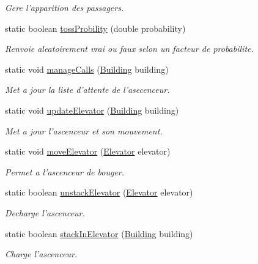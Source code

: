 \begin{DoxyCompactItemize}
\begin{DoxyCompactList}\small\item\em Gere l'apparition des passagers. \end{DoxyCompactList}\item 
static boolean \hyperlink{classElevatorProject_a5ec35e7e25ad0689872b3e1801881363}{toss\-Probility} (double probability)
\begin{DoxyCompactList}\small\item\em Renvoie aleatoirement vrai ou faux selon un facteur de probabilite. \end{DoxyCompactList}\item 
static void \hyperlink{classElevatorProject_a47e8310e972ae9a6f5b97e61af75b733}{manage\-Calls} (\hyperlink{classElevatorProject_1_1Building}{Building} building)
\begin{DoxyCompactList}\small\item\em Met a jour la liste d'attente de l'asecenceur. \end{DoxyCompactList}\item 
static void \hyperlink{classElevatorProject_a728434fe5435fc78b48a67bd14cafd41}{update\-Elevator} (\hyperlink{classElevatorProject_1_1Building}{Building} building)
\begin{DoxyCompactList}\small\item\em Met a jour l'ascenceur et son mouvement. \end{DoxyCompactList}\item 
static void \hyperlink{classElevatorProject_a5db832b5592e8a9229dc15abdd4430aa}{move\-Elevator} (\hyperlink{classElevatorProject_1_1Elevator}{Elevator} elevator)
\begin{DoxyCompactList}\small\item\em Permet a l'ascenceur de bouger. \end{DoxyCompactList}\item 
static boolean \hyperlink{classElevatorProject_a1f44c119fd987a5fac357244fbfe93bc}{unstack\-Elevator} (\hyperlink{classElevatorProject_1_1Elevator}{Elevator} elevator)
\begin{DoxyCompactList}\small\item\em Decharge l'ascenceur. \end{DoxyCompactList}\item 
static boolean \hyperlink{classElevatorProject_a7cb85c87b7466ac344bfb6f6681835ca}{stack\-In\-Elevator} (\hyperlink{classElevatorProject_1_1Building}{Building} building)
\begin{DoxyCompactList}\small\item\em Charge l'ascenceur. \end{DoxyCompactList}\item 

\end{DoxyCompactItemize}
